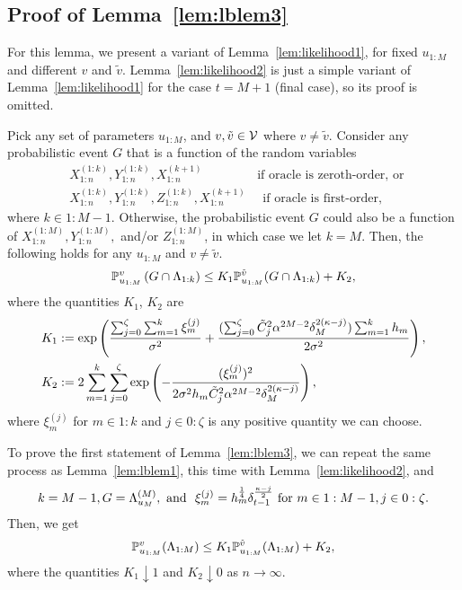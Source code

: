 \subsection{Proof of Lemma~\ref{lem:lblem3}}
\label{sec:proof-lblem3}
For this lemma, we present a variant of Lemma~\ref{lem:likelihood1}, for fixed $u_{1:M}$ and different $v$ and $\tilde v$. Lemma~\ref{lem:likelihood2} is just a simple variant of Lemma~\ref{lem:likelihood1} for the case $t = M+1$ (final case), so its proof is omitted.
\begin{lemma}
	\label{lem:likelihood2}
	Pick any set of parameters $u_{1:M}$, and $v, \tilde v \in \mathcal{V}$ where $v \neq \tilde v$.
	Consider any probabilistic event $G$ that is a function of the random variables 
	\begin{align*}
		&X_{1:n}^{(1:k)}, Y_{1:n}^{(1:k)}, X_{1:n}^{(k+1)} 
		\quad\quad\quad\quad \text{ if oracle is zeroth-order, or }\\
		&X_{1:n}^{(1:k)}, Y_{1:n}^{(1:k)}, Z_{1:n}^{(1:k)}, X_{1:n}^{(k+1)}
		\quad \text{ if oracle is first-order,}
	\end{align*}
	where $k \in 1:M-1$. 
	Otherwise, the probabilistic event $G$ could also be a function of $X_{1:n}^{(1:M)}, Y_{1:n}^{(1:M)},$ and/or $Z_{1:n}^{(1:M)}$, in which case we let $k = M$.
	Then, the following holds for any $u_{1:M}$ and $v \neq \tilde v$.
	\begin{equation*}
		\mathbb{P}_{u_{1:M}}^v \left( G \cap \Lambda_{1:{k}} \right)\leq K_1 \mathbb{P}_{u_{1:M}}^{\tilde v} ( G \cap \Lambda_{1:{k}} ) + K_2,
	\end{equation*}
	where the quantities $K_1$, $K_2$ are
	\begin{align*}
		K_1 &:= \exp \left ( \frac{\sum_{j=0}^\zeta \sum_{m=1}^{k} \xi_m^{(j)}}{\sigma^2} + 
		\frac {(\sum_{j=0}^\zeta \tilde C_j^2 \alpha^{2M-2} \delta_{M}^{2(\kappa-j)}) \sum_{m=1}^k h_m}{2 \sigma^2}  \right ),\\
		K_2 &:= 2 \sum_{m=1}^{k} \sum_{j=0}^{\zeta}
		\exp \left (  -\frac {(\xi_m^{(j)})^2}{2 \sigma^2  h_{m} \tilde C_j^2 \alpha^{2M-2} \delta_{M}^{2(\kappa-j)}}  \right ),
	\end{align*}
	where $\xi_m^{(j)}$ for $m \in 1:k$ and $j \in 0:\zeta$ is any positive quantity we can choose.
\end{lemma}

To prove the first statement of Lemma~\ref{lem:lblem3}, we can repeat the same process as Lemma~\ref{lem:lblem1}, this time with Lemma~\ref{lem:likelihood2}, and
\begin{align*}
	k = M-1, 
	G = \Lambda_{u_{M}}^{({M})}, \text{ and }~
	\xi_m^{(j)} = h_m^{\frac{1}{4}} \delta_{t-1}^{\frac{\kappa-j}{2}} \text{ for } m \in 1:M-1, j \in 0:\zeta.
\end{align*}
Then, we get 
\begin{equation*}
	\mathbb{P}_{u_{1:M}}^v ( \Lambda_{1:{M}} )\leq K_1 \mathbb{P}_{u_{1:M}}^{\tilde v} ( \Lambda_{1:{M}} ) + K_2,
\end{equation*}
where the quantities $K_1 \downarrow 1$ and $K_2 \downarrow 0$ as $n \rightarrow \infty$.

